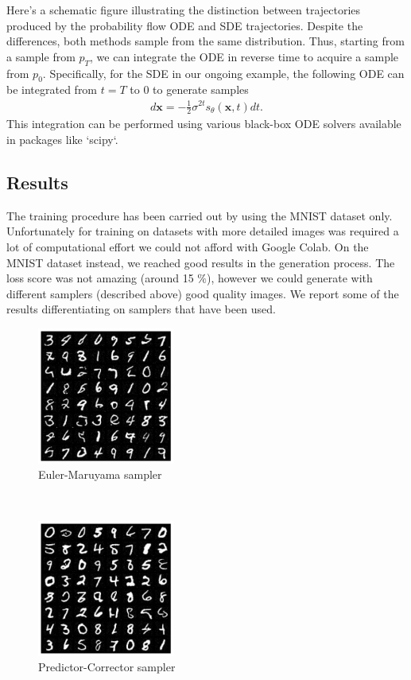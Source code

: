 \documentclass{article}
\begin{document}
Here's a schematic figure illustrating the distinction between trajectories produced by the probability flow ODE and SDE trajectories. Despite the differences, both methods sample from the same distribution. Thus, starting from a sample from $p_T$, we can integrate the ODE in reverse time to acquire a sample from $p_0$. Specifically, for the SDE in our ongoing example, the following ODE can be integrated from $t=T$ to $0$ to generate samples
\begin{align*}
d\mathbf{x} =  -\frac{1}{2}\sigma^{2t} s_\theta(\mathbf{x}, t) dt.
\end{align*}
This integration can be performed using various black-box ODE solvers available in packages like `scipy`.
\subsection{Results}
The training procedure has been carried out by using the MNIST dataset only. Unfortunately for training on datasets with more detailed images was required a lot of computational effort we could not afford with Google Colab. On the MNIST dataset instead, we reached good results in the generation process. The loss score was not amazing (around 15 $ \% $), however we could generate with different samplers (described above) good quality images. We report some of the results differentiating on samplers that have been used. \\
\begin{figure}[htbp]
    \centering
    \includegraphics[width=0.4\textwidth]{EM} 
    \caption{Euler-Maruyama sampler}
\end{figure} \\
\newline
\begin{figure}[htbp]
    \centering
    \includegraphics[width=0.4\textwidth]{PC} 
    \caption{Predictor-Corrector sampler}
\end{figure} \\
\end{document}
